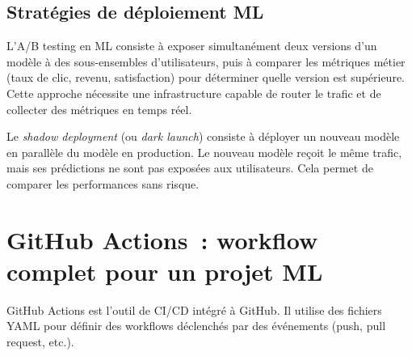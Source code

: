 \subsection{Strat\'egies de d\'eploiement ML}

\begin{definition}
L'A/B testing en ML consiste \`a exposer simultan\'ement deux versions d'un mod\`ele \`a des sous-ensembles d'utilisateurs, puis \`a comparer les m\'etriques m\'etier (taux de clic, revenu, satisfaction) pour d\'eterminer quelle version est sup\'erieure. Cette approche n\'ecessite une infrastructure capable de router le trafic et de collecter des m\'etriques en temps r\'eel.
\end{definition}

\begin{definition}
Le \emph{shadow deployment} (ou \emph{dark launch}) consiste \`a d\'eployer un nouveau mod\`ele en parall\`ele du mod\`ele en production. Le nouveau mod\`ele re\c{c}oit le m\^eme trafic, mais ses pr\'edictions ne sont pas expos\'ees aux utilisateurs. Cela permet de comparer les performances sans risque.
\end{definition}

\section{GitHub Actions~: workflow complet pour un projet ML}
\label{sec:github-actions}

GitHub Actions est l'outil de CI/CD int\'egr\'e \`a GitHub. Il utilise des fichiers YAML pour d\'efinir des workflows d\'eclench\'es par des \'ev\'enements (push, pull request, etc.).

